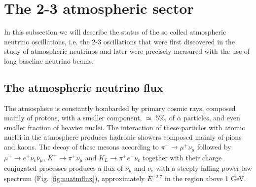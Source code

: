 \section{The 2-3 atmospheric sector }

In this subsection we will describe the status of the so called atmospheric neutrino oscillations, i.e. the 2-3 oscillations that were first discovered in the study of atmospheric neutrinos and later were precisely measured with the use of long baseline neutrino beams.   


\subsection{The atmospheric neutrino flux}

The atmosphere is constantly bombarded by primary cosmic rays, composed mainly of protons, with a smaller component, $\simeq$ 5\%, of $\alpha$ particles, and even smaller fraction of heavier nuclei. The interaction of these particles with atomic nuclei in the atmosphere produces hadronic showers composed mainly of pions and kaons. The decay of these mesons according to 
$\pi^+ \rightarrow \mu^+ \nu_\mu$ followed by 
$\mu^+ \rightarrow e^+ \nu_e \bar{\nu}_\mu $,
$K^+ \rightarrow \pi^+ \nu_\mu$ and $K_L \rightarrow \pi^+ e^- \nu_e$
together with their charge conjugated processes produces a flux of $\nu_\mu$ and $\nu_e$ with a steeply falling power-law spectrum (Fig. \ref{fig:nuatmflux}), approximately $E^{-2.7}$ in the region above 1 GeV.   


